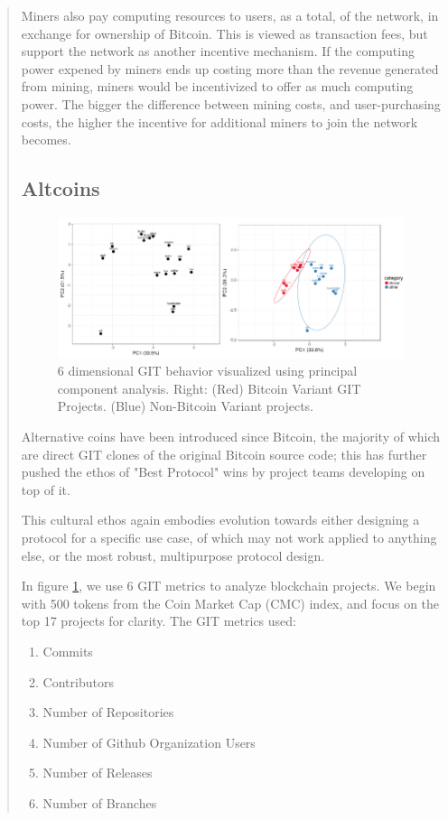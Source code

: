 \documentclass[12pt, titlepage, twocolumn]{report}
\begin{document}
\begin{quotation}
Miners also pay computing resources to users, as a total, of the network, in exchange for ownership of Bitcoin. This is viewed as transaction fees, but support the network as another incentive mechanism. If the computing power expened by miners ends up costing more than the revenue generated from mining, miners would be incentivized to offer as much computing power. The bigger the difference between mining costs, and user-purchasing costs, the higher the incentive for additional miners to join the network becomes. 



\subsection{Altcoins}

\begin{figure}[ht]
\centering
	\includegraphics[width=\textwidth]{git_ana_both}
	\caption{6 dimensional GIT behavior visualized using principal component analysis. Right: (Red) Bitcoin Variant GIT Projects. (Blue) Non-Bitcoin Variant projects.}
	\label{git_ana_both}
\end{figure}


Alternative coins have been introduced since Bitcoin, the majority of which are direct GIT clones of the original Bitcoin source code; this has further pushed the ethos of "Best Protocol" wins by project teams developing on top of it.

This cultural ethos again embodies evolution towards either designing a protocol for a specific use case, of which may not work applied to anything else, or the most robust, multipurpose protocol design.

In figure \ref{git_ana_both}, we use 6 GIT metrics to analyze blockchain projects. We begin with 500 tokens from the Coin Market Cap (CMC) index, and focus on the top 17 projects for clarity. The GIT metrics used:

\begin{enumerate}
	\item Commits
	\item Contributors
	\item Number of Repositories
	\item Number of Github Organization Users
	\item Number of Releases
	\item Number of Branches
\end{enumerate}


\end{quotation}
\end{document}
